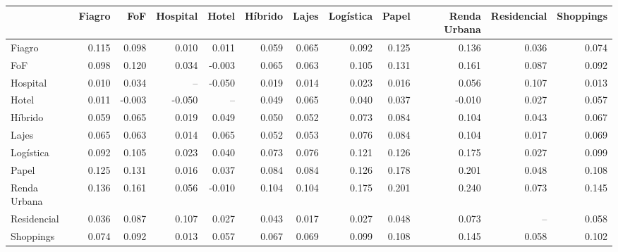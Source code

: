 \begin{tabular}{lrrrrrrrrrrr}
\toprule
 & Fiagro & FoF & Hospital & Hotel & Híbrido & Lajes & Logística & Papel & Renda Urbana & Residencial & Shoppings \\
\midrule
Fiagro & 0.115 & 0.098 & 0.010 & 0.011 & 0.059 & 0.065 & 0.092 & 0.125 & 0.136 & 0.036 & 0.074 \\
FoF & 0.098 & 0.120 & 0.034 & -0.003 & 0.065 & 0.063 & 0.105 & 0.131 & 0.161 & 0.087 & 0.092 \\
Hospital & 0.010 & 0.034 & -- & -0.050 & 0.019 & 0.014 & 0.023 & 0.016 & 0.056 & 0.107 & 0.013 \\
Hotel & 0.011 & -0.003 & -0.050 & -- & 0.049 & 0.065 & 0.040 & 0.037 & -0.010 & 0.027 & 0.057 \\
Híbrido & 0.059 & 0.065 & 0.019 & 0.049 & 0.050 & 0.052 & 0.073 & 0.084 & 0.104 & 0.043 & 0.067 \\
Lajes & 0.065 & 0.063 & 0.014 & 0.065 & 0.052 & 0.053 & 0.076 & 0.084 & 0.104 & 0.017 & 0.069 \\
Logística & 0.092 & 0.105 & 0.023 & 0.040 & 0.073 & 0.076 & 0.121 & 0.126 & 0.175 & 0.027 & 0.099 \\
Papel & 0.125 & 0.131 & 0.016 & 0.037 & 0.084 & 0.084 & 0.126 & 0.178 & 0.201 & 0.048 & 0.108 \\
Renda Urbana & 0.136 & 0.161 & 0.056 & -0.010 & 0.104 & 0.104 & 0.175 & 0.201 & 0.240 & 0.073 & 0.145 \\
Residencial & 0.036 & 0.087 & 0.107 & 0.027 & 0.043 & 0.017 & 0.027 & 0.048 & 0.073 & -- & 0.058 \\
Shoppings & 0.074 & 0.092 & 0.013 & 0.057 & 0.067 & 0.069 & 0.099 & 0.108 & 0.145 & 0.058 & 0.102 \\
\bottomrule
\end{tabular}
